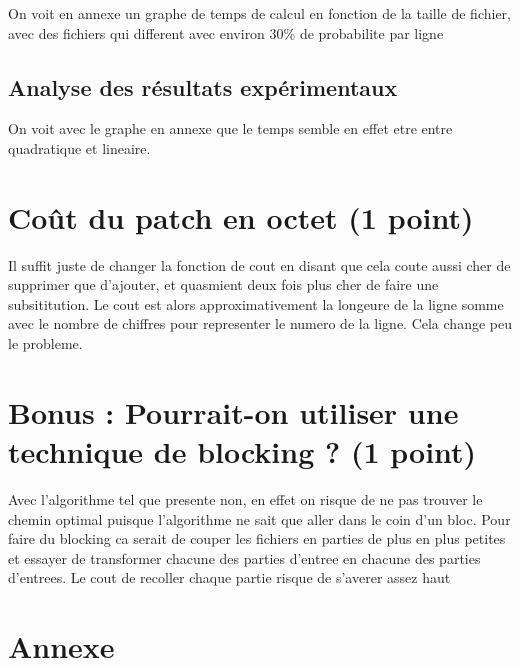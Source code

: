 \documentclass[a4paper,10pt,french]{article}
\begin{document}
	On voit en annexe un graphe de temps de calcul en fonction de la taille de fichier, avec des fichiers qui different avec environ 30\% de probabilite par ligne

\subsection{Analyse des résultats expérimentaux}
On voit avec le graphe en annexe que le temps semble en effet etre entre quadratique et lineaire.

\section{Coût du patch en octet (1 point)}
Il suffit juste de changer la fonction de cout en disant que cela coute aussi cher de supprimer que d'ajouter, et quasmient deux fois plus cher de faire une subsititution. Le cout est alors approximativement la longeure de la ligne somme avec le nombre de chiffres pour representer le numero de la ligne. Cela change peu le probleme.
\section{Bonus : Pourrait-on utiliser une technique de blocking ? (1 point)}
Avec l'algorithme tel que presente non, en effet on risque de ne pas trouver le chemin optimal puisque l'algorithme ne sait que aller dans le coin d'un bloc. Pour faire du blocking ca serait de couper les fichiers en parties de plus en plus petites et essayer de transformer chacune des parties d'entree en chacune des parties d'entrees. Le cout de recoller chaque partie risque de s'averer assez haut

\section*{Annexe}
\end{document}
